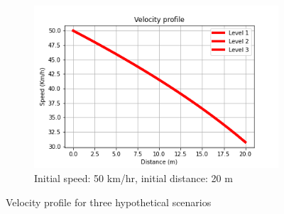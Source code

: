 \begin{figure}[!t]
\begin{adjustbox}{varwidth=\textwidth,fbox,center}
\begin{subfigure}{0.8\linewidth}
\centering
\includegraphics[scale=0.4]{appendix/figures/r20_50.png}
\caption{Initial speed: 50 km/hr, initial distance: 20 m}

\end{subfigure}
\end{adjustbox}
\caption{Velocity profile for three hypothetical scenarios}
\label{fig:prof}
\end{figure}

